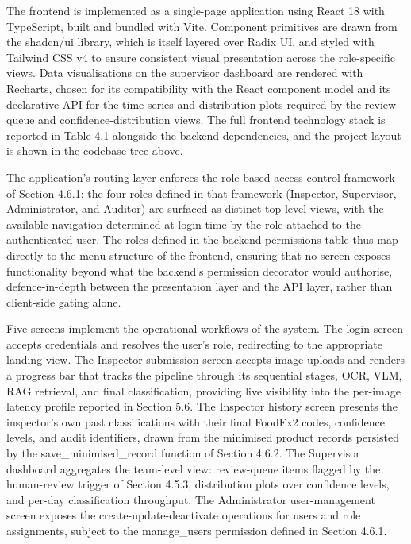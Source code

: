 The frontend is implemented as a single-page application using React 18 with TypeScript, built and bundled with Vite. Component primitives are drawn from the shadcn/ui library, which is itself layered over Radix UI, and styled with Tailwind CSS v4 to ensure consistent visual presentation across the role-specific views. Data visualisations on the supervisor dashboard are rendered with Recharts, chosen for its compatibility with the React component model and its declarative API for the time-series and distribution plots required by the review-queue and confidence-distribution views. The full frontend technology stack is reported in Table 4.1 alongside the backend dependencies, and the project layout is shown in the codebase tree above.

The application's routing layer enforces the role-based access control framework of Section 4.6.1: the four roles defined in that framework (Inspector, Supervisor, Administrator, and Auditor) are surfaced as distinct top-level views, with the available navigation determined at login time by the role attached to the authenticated user. The roles defined in the backend permissions table thus map directly to the menu structure of the frontend, ensuring that no screen exposes functionality beyond what the backend's permission decorator would authorise, defence-in-depth between the presentation layer and the API layer, rather than client-side gating alone.

Five screens implement the operational workflows of the system. The login screen accepts credentials and resolves the user's role, redirecting to the appropriate landing view. The Inspector submission screen accepts image uploads and renders a progress bar that tracks the pipeline through its sequential stages, OCR, VLM, RAG retrieval, and final classification, providing live visibility into the per-image latency profile reported in Section 5.6. The Inspector history screen presents the inspector's own past classifications with their final FoodEx2 codes, confidence levels, and audit identifiers, drawn from the minimised product records persisted by the save\_minimised\_record function of Section 4.6.2. The Supervisor dashboard aggregates the team-level view: review-queue items flagged by the human-review trigger of Section 4.5.3, distribution plots over confidence levels, and per-day classification throughput. The Administrator user-management screen exposes the create-update-deactivate operations for users and role assignments, subject to the manage\_users permission defined in Section 4.6.1.


